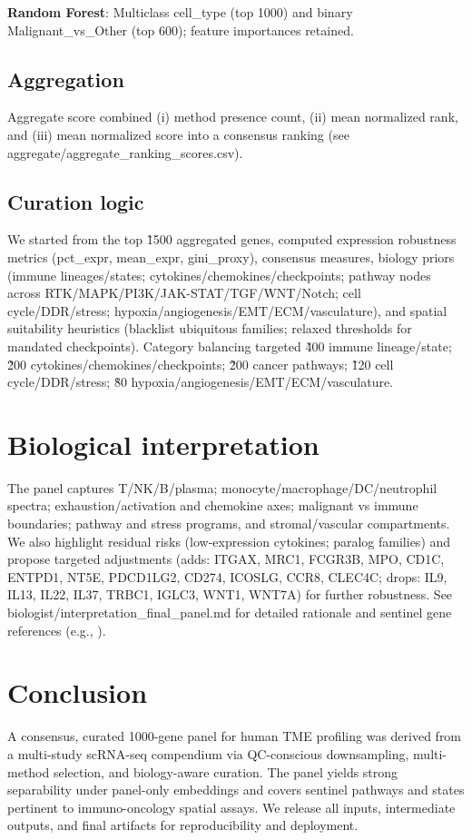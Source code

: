 \documentclass[11pt]{article}
\begin{document}
\textbf{Random Forest}: Multiclass cell\_type (top 1000) and binary Malignant\_vs\_Other (top 600); feature importances retained.

\subsection{Aggregation}
Aggregate score combined (i) method presence count, (ii) mean normalized rank, and (iii) mean normalized score into a consensus ranking (see aggregate/aggregate\_ranking\_scores.csv).

\subsection{Curation logic}
We started from the top \~1500 aggregated genes, computed expression robustness metrics (pct\_expr, mean\_expr, gini\_proxy), consensus measures, biology priors (immune lineages/states; cytokines/chemokines/checkpoints; pathway nodes across RTK/MAPK/PI3K/JAK-STAT/TGF\beta/WNT/Notch; cell cycle/DDR/stress; hypoxia/angiogenesis/EMT/ECM/vasculature), and spatial suitability heuristics (blacklist ubiquitous families; relaxed thresholds for mandated checkpoints). Category balancing targeted \~400 immune lineage/state; \~200 cytokines/chemokines/checkpoints; \~200 cancer pathways; \~120 cell cycle/DDR/stress; \~80 hypoxia/angiogenesis/EMT/ECM/vasculature.

\section{Biological interpretation}
The panel captures T/NK/B/plasma; monocyte/macrophage/DC/neutrophil spectra; exhaustion/activation and chemokine axes; malignant vs immune boundaries; pathway and stress programs, and stromal/vascular compartments. We also highlight residual risks (low-expression cytokines; paralog families) and propose  targeted adjustments (adds: ITGAX, MRC1, FCGR3B, MPO, CD1C, ENTPD1, NT5E, PDCD1LG2, CD274, ICOSLG, CCR8, CLEC4C; drops: IL9, IL13, IL22, IL37, TRBC1, IGLC3, WNT1, WNT7A) for further robustness. See biologist/interpretation\_final\_panel.md for detailed rationale and sentinel gene references (e.g., \cite{GeneCards_CD3E,UniProt_CD3E,GeneCards_TRAC,UniProt_TRAC,GeneCards_PRF1,UniProt_PRF1}).

\section{Conclusion}
A consensus, curated 1000-gene panel for human TME profiling was derived from a multi-study scRNA-seq compendium via QC-conscious downsampling, multi-method selection, and biology-aware curation. The panel yields strong separability under panel-only embeddings and covers sentinel pathways and states pertinent to immuno-oncology spatial assays. We release all inputs, intermediate outputs, and final artifacts for reproducibility and deployment.
\end{document}
